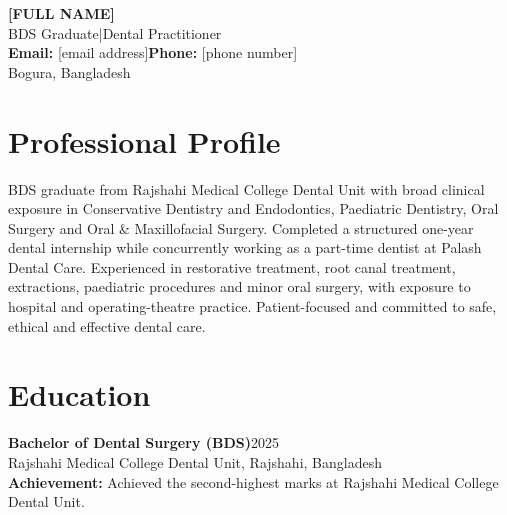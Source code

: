 \documentclass[10pt,a4paper]{article}
\begin{document}
{\Huge\bfseries\color{navy}[FULL NAME]}\\[6pt]
{\large BDS Graduate\enspace |\enspace Dental Practitioner}\\[5pt]
\textbf{Email:} [email address]\qquad\textbf{Phone:} [phone number]\\
Bogura, Bangladesh

\section{Professional Profile}
BDS graduate from Rajshahi Medical College Dental Unit with broad clinical exposure in Conservative Dentistry and Endodontics, Paediatric Dentistry, Oral Surgery and Oral \& Maxillofacial Surgery. Completed a structured one-year dental internship while concurrently working as a part-time dentist at Palash Dental Care. Experienced in restorative treatment, root canal treatment, extractions, paediatric procedures and minor oral surgery, with exposure to hospital and operating-theatre practice. Patient-focused and committed to safe, ethical and effective dental care.

\section{Education}
\textbf{Bachelor of Dental Surgery (BDS)}\hfill 2025\\
Rajshahi Medical College Dental Unit, Rajshahi, Bangladesh\\
\textbf{Achievement:} Achieved the second-highest marks at Rajshahi Medical College Dental Unit.
\end{document}
